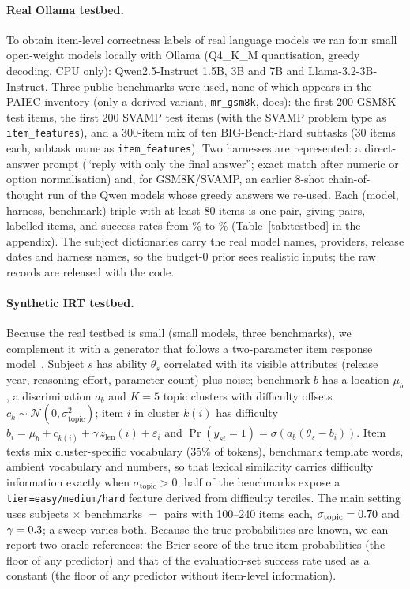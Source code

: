 \documentclass{article}
\begin{document}
\paragraph{Real Ollama testbed.}
To obtain item-level correctness labels of real language models we ran four small open-weight models locally with Ollama (Q4\_K\_M quantisation, greedy decoding, CPU only): Qwen2.5-Instruct 1.5B, 3B and 7B and Llama-3.2-3B-Instruct. Three public benchmarks were used, none of which appears in the PAIEC inventory (only a derived variant, \texttt{mr\_gsm8k}, does): the first 200 GSM8K test items, the first 200 SVAMP test items (with the SVAMP problem type as \texttt{item\_features}), and a 300-item mix of ten BIG-Bench-Hard subtasks (30 items each, subtask name as \texttt{item\_features}). Two harnesses are represented: a direct-answer prompt (``reply with only the final answer''; exact match after numeric or option normalisation) and, for GSM8K/SVAMP, an earlier 8-shot chain-of-thought run of the Qwen models whose greedy answers we re-used. Each (model, harness, benchmark) triple with at least 80 items is one pair, giving \RNPairsMeta{} pairs, \RNItemsTotal{} labelled items, and success rates from \RAccMin\% to \RAccMax\% (Table~\ref{tab:testbed} in the appendix). The subject dictionaries carry the real model names, providers, release dates and harness names, so the budget-0 prior sees realistic inputs; the raw records are released with the code.

\paragraph{Synthetic IRT testbed.}
Because the real testbed is small (small models, three benchmarks), we complement it with a generator that follows a two-parameter item response model~\citep{lord1980,embretson2000}. Subject $s$ has ability $\theta_s$ correlated with its visible attributes (release year, reasoning effort, parameter count) plus noise; benchmark $b$ has a location $\mu_b$, a discrimination $a_b$ and $K=5$ topic clusters with difficulty offsets $c_k\sim\mathcal N(0,\sigma_{\mathrm{topic}}^2)$; item $i$ in cluster $k(i)$ has difficulty $b_i=\mu_b+c_{k(i)}+\gamma\,z_{\mathrm{len}}(i)+\varepsilon_i$ and $\Pr(y_{si}=1)=\sigma(a_b(\theta_s-b_i))$. Item texts mix cluster-specific vocabulary (35\% of tokens), benchmark template words, ambient vocabulary and numbers, so that lexical similarity carries difficulty information exactly when $\sigma_{\mathrm{topic}}>0$; half of the benchmarks expose a \texttt{tier=easy/medium/hard} feature derived from difficulty terciles. The main setting uses \SNSubjects{} subjects $\times$ \SNBenchmarks{} benchmarks $=$ \SNPairs{} pairs with 100--240 items each, $\sigma_{\mathrm{topic}}=0.70$ and $\gamma=0.3$; a sweep varies both. Because the true probabilities are known, we can report two oracle references: the Brier score of the true item probabilities (the floor of any predictor) and that of the evaluation-set success rate used as a constant (the floor of any predictor without item-level information).
\end{document}
